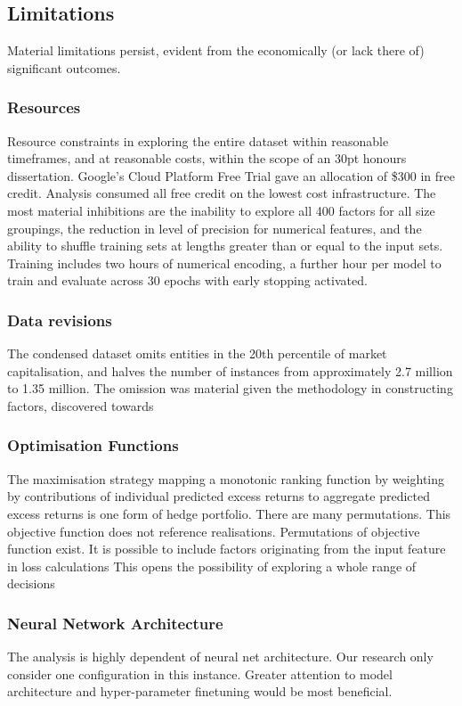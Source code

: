\documentclass[12pt]{article}
\begin{document}
\subsection{Limitations}
Material limitations persist, evident from the economically (or lack there of) significant outcomes.
\subsubsection{Resources}
Resource constraints in exploring the entire dataset within reasonable timeframes, and at reasonable costs, within the scope of an 30pt honours dissertation.
Google's Cloud Platform Free Trial gave an allocation of \$300 in free credit. Analysis consumed all free credit on the lowest cost infrastructure.
The most material inhibitions are the inability to explore all 400 factors for all size groupings, the reduction in level of precision for numerical features, and
the ability to shuffle training sets at lengths greater than or equal to the input sets.
Training includes two hours of numerical encoding, a further hour per model to train and evaluate across 30 epochs with early stopping activated.
\subsubsection{Data revisions}
The condensed dataset omits entities in the 20th percentile of market capitalisation, and halves the number of instances from approximately 2.7 million to 1.35 million.
The omission was material given the methodology in constructing factors, discovered towards
\subsubsection{Optimisation Functions}
The maximisation strategy mapping a monotonic ranking function by weighting by contributions of individual predicted excess returns to aggregate predicted excess returns is one form of hedge portfolio.
There are many permutations. 
This objective function does not reference realisations.
Permutations of objective function exist.
It is possible to include factors originating from the input feature in loss calculations
This opens the possibility of exploring a whole range of decisions 
\subsubsection{Neural Network Architecture}
The analysis is highly dependent of neural net architecture.
Our research only consider one configuration in this instance.
Greater attention to model architecture and hyper-parameter finetuning would be most beneficial.
\end{document}
